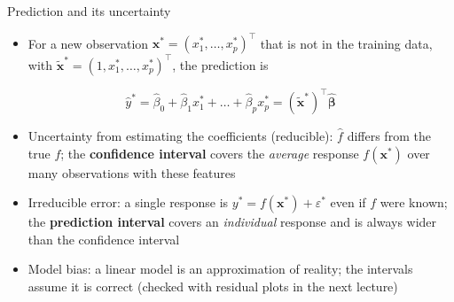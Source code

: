 \begin{frame}{Prediction and its uncertainty}
    \begin{itemize}
        \item For a new observation $\mathbf{x}^\ast = (x_1^\ast, \dots, x_p^\ast)^\top$ that is not in the training data, with $\tilde{\mathbf{x}}^\ast = (1, x_1^\ast, \dots, x_p^\ast)^\top$, the prediction is
    \end{itemize}
    \[
        \hat{y}^\ast = \hat\beta_0 + \hat\beta_1 x_1^\ast + \dots + \hat\beta_p x_p^\ast = (\tilde{\mathbf{x}}^\ast)^\top \hat{\symbf{\beta}}
    \]
    \begin{itemize}
        \item Uncertainty from estimating the coefficients (reducible): $\hat{f}$ differs from the true $f$; the \textbf{confidence interval} covers the \emph{average} response $f(\mathbf{x}^\ast)$ over many observations with these features
        \item Irreducible error: a single response is $y^\ast = f(\mathbf{x}^\ast) + \varepsilon^\ast$ even if $f$ were known; the \textbf{prediction interval} covers an \emph{individual} response and is always wider than the confidence interval
        \item Model bias: a linear model is an approximation of reality; the intervals assume it is correct (checked with residual plots in the next lecture)
    \end{itemize}
\end{frame}


